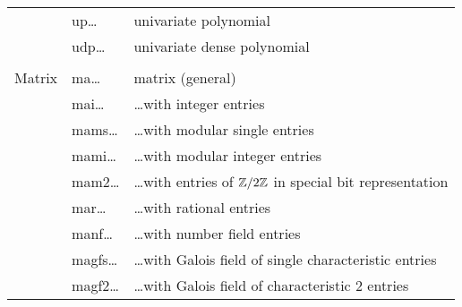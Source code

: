 \begin{tabular}{p{1.0in}p{1.3in}p{3.0in}}
                   & up\ldots      & univariate polynomial\\
                   & udp\ldots     & univariate dense polynomial\\
                   &               & \\
 Matrix            & ma\ldots      & matrix (general) \\ 
                   & mai\ldots     & \ldots with integer entries\\
                   & mams\ldots    & \ldots with modular single entries\\
                   & mami\ldots    & \ldots with modular integer entries\\
                   & mam2\ldots    & \ldots with entries of $\mbox{$\mathbb Z$}/2\mbox{$\mathbb Z$}$ in special bit re\-pre\-sen\-ta\-tion\\
                   & mar\ldots     & \ldots with rational entries\\
                   & manf\ldots    & \ldots with number field entries\\
                   & magfs\ldots   & \ldots with Galois field of single characteristic entries\\
                   & magf2\ldots   & \ldots with Galois field of characteristic 2 entries
\end{tabular}
\newpage

